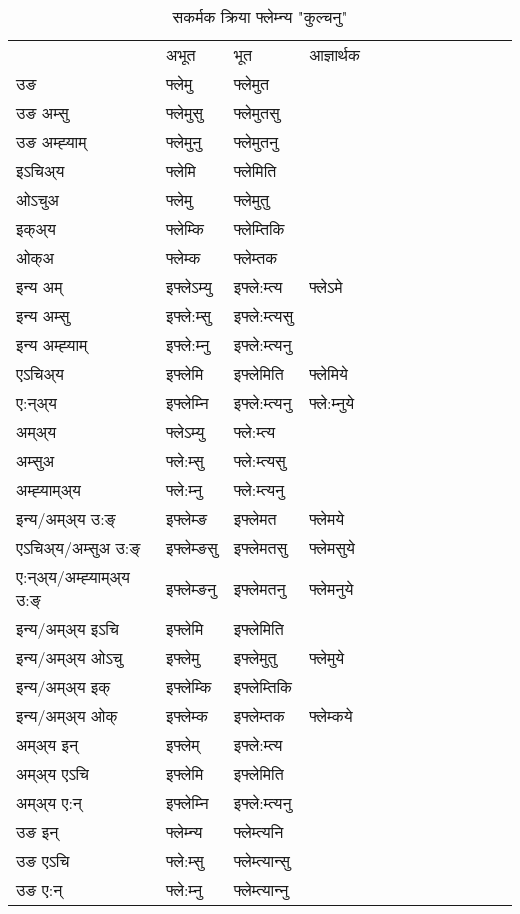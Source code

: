 \begin{table}[H]
\centering
\caption{\label{em.vt} सकर्मक क्रिया  फ्लेम्‍न्य  "कुल्चनु"  }
\begin{tabular}{l|l|l|l|l|l|l|l|l|l|l|l|l}  \toprule
&अभूत & भूत & आज्ञार्थक \\ 
उङ &फ्लेमु &फ्लेमुत \\ 
उङ अम्सु &फ्लेमुसु &फ्लेमुतसु \\ 
उङ अम्ह्‍याम् &फ्लेमुनु &फ्लेमुतनु \\ 
इऽचिअ्य &फ्लेमि &फ्लेमिति   \\ 
ओऽचुअ &फ्लेमु &फ्लेमुतु   \\ 
इक्अ्य &फ्लेम्कि &फ्लेम्तिकि   \\ 
ओक्अ &फ्लेम्क &फ्लेम्तक   \\ 
इन्य अम् & इफ्लेऽम्यु  & इफ्ले:म्त्य &फ्लेऽमे  \\ 
इन्य अम्सु & इफ्ले:म्सु  & इफ्ले:म्त्यसु   \\ 
इन्य अम्ह्‍याम् & इफ्ले:म्‍नु  & इफ्ले:म्त्यनु   \\ 
एऽचिअ्य & इफ्लेमि & इफ्लेमिति &फ्लेमिये    \\ 
ए:न्अ्य & इफ्लेम्‍नि  & इफ्ले:म्त्यनु &फ्ले:म्‍नुये  \\ 
अम्अ्य & फ्लेऽम्यु  & फ्ले:म्त्य  \\ 
अम्सुअ & फ्ले:म्सु & फ्ले:म्त्यसु  \\ 
अम्ह्‍याम्अ्य & फ्ले:म्‍नु  & फ्ले:म्त्यनु \\ 
\midrule
इन्य/अम्अ्य उ:ङ्‌&इफ्लेम्ङ & इफ्लेमत &फ्लेमये \\ 
एऽचिअ्य/अम्सुअ उ:ङ्‌ &इफ्लेम्ङसु & इफ्लेमतसु &फ्लेमसुये \\ 
ए:न्अ्य/अम्ह्‍याम्अ्य उ:ङ्‌ &इफ्लेम्ङनु & इफ्लेमतनु &फ्लेमनुये \\ 
इन्य/अम्अ्य इऽचि & इफ्लेमि & इफ्लेमिति    \\ 
इन्य/अम्अ्य ओऽचु & इफ्लेमु & इफ्लेमुतु  &फ्लेमुये  \\ 
इन्य/अम्अ्य इक् & इफ्लेम्कि & इफ्लेम्तिकि   \\ 
इन्य/अम्अ्य ओक् & इफ्लेम्क & इफ्लेम्तक  &फ्लेम्कये  \\ 
अम्अ्य इन् & इफ्लेम् & इफ्ले:म्त्य   \\ 
अम्अ्य एऽचि & इफ्लेमि & इफ्लेमिति    \\ 
अम्अ्य ए:न् & इफ्लेम्‍नि  & इफ्ले:म्त्यनु  \\ 
\midrule
उङ इन् & फ्लेम्‍न्य  & फ्लेम्त्यनि  \\ 
उङ एऽचि & फ्ले:म्सु  & फ्लेम्त्यान्सु   \\ 
उङ ए:न्& फ्ले:म्‍नु  & फ्लेम्त्यान्‍नु   \\ 
\bottomrule
\end{tabular}
\end{table}


